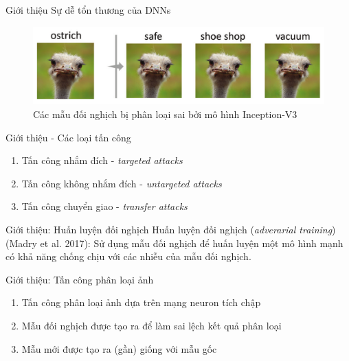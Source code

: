 \begin{frame}{Giới thiệu}
    Sự dễ tổn thương của DNNs
    \begin{figure}
    \centering
    \includegraphics[scale=0.2]{images/fig_01.png}
    \caption{Các mẫu đối nghịch bị phân loại sai
        bởi mô hình Inception-V3}
    \end{figure}
\end{frame}

\begin{frame}{Giới thiệu - Các loại tấn công}
    \begin{enumerate}
        \item Tấn công nhắm đích - \textit{targeted attacks}
        \item Tấn công không nhắm đích - \textit{untargeted attacks}
        \item Tấn công chuyển giao - \textit{transfer attacks}
    \end{enumerate}
\end{frame}

\begin{frame}{Giới thiệu: Huấn luyện đối nghịch}
    Huấn luyện đối nghịch (\textit{adverarial training}) (Madry et al. 2017): Sử dụng mẫu đối nghịch để huấn luyện một mô hình mạnh có khả năng chống chịu với các nhiễu của mẫu đối nghịch.
\end{frame}

\begin{frame}{Giới thiệu: Tấn công phân loại ảnh}
    \begin{enumerate}
        \item Tấn công phân loại ảnh dựa trên mạng neuron tích chập
        \item Mẫu đối nghịch được tạo ra để làm sai lệch kết quả phân loại
        \item Mẫu mới được tạo ra (gần) giống với mẫu gốc
    \end{enumerate}
\end{frame}

